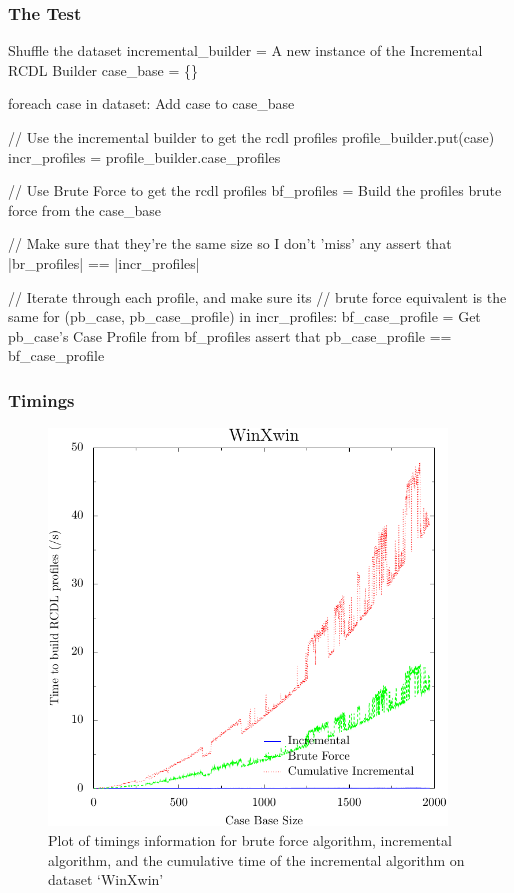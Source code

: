 \documentclass[a4paper,11pt]{report}
\begin{document}
\subsubsection{The Test}
\nopagebreak[4]
\begin{code}
Shuffle the dataset
incremental_builder = A new instance of the Incremental RCDL Builder
case_base = \{\}

foreach case in dataset:
  Add case to case_base
  
  // Use the incremental builder to get the rcdl profiles
  profile_builder.put(case)
  incr_profiles = profile_builder.case_profiles
  
  // Use Brute Force to get the rcdl profiles
  bf_profiles = Build the profiles brute force from the case_base
  
  // Make sure that they're the same size so I don't 'miss' any
  assert that |br_profiles| == |incr_profiles|
  
  // Iterate through each profile, and make sure its 
  // brute force equivalent is the same
  for (pb_case, pb_case_profile) in incr_profiles:
      bf_case_profile = Get pb_case's Case Profile from bf_profiles
      assert that pb_case_profile == bf_case_profile
\end{code}

\subsubsection{Timings}
\begin{figure}[h!] 
\centering
\includegraphics[width=300pt]{./ExperimentResults/WinXwin_timings_all}
\caption{Plot of timings information for brute force algorithm, incremental algorithm, and the cumulative time of the incremental algorithm on dataset `WinXwin'}
\label{fig:winxwintimingsall}
\end{figure}
\end{document}
